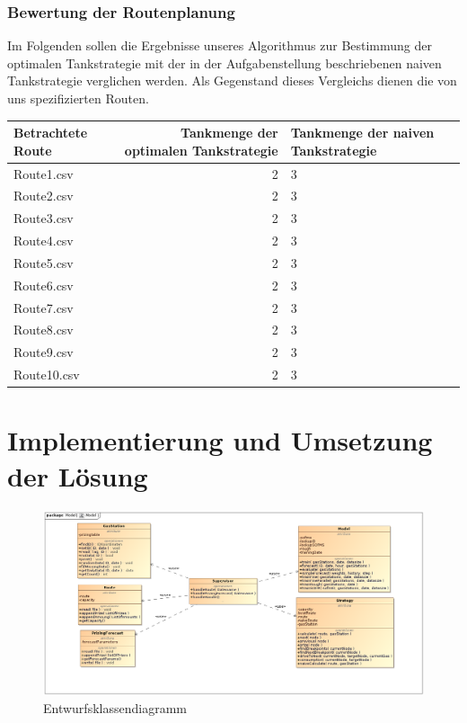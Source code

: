 \documentclass[11pt]{article}
\begin{document}
\subsubsection{Bewertung der Routenplanung}
	Im Folgenden sollen die Ergebnisse unseres Algorithmus zur Bestimmung der optimalen Tankstrategie mit der in der Aufgabenstellung beschriebenen naiven Tankstrategie verglichen werden. Als Gegenstand dieses Vergleichs dienen die von uns spezifizierten Routen.\\
	\begin{tabularx}{\textwidth}{p{}|r|X|r}
		Betrachtete Route & Tankmenge der optimalen Tankstrategie & Tankmenge der naiven Tankstrategie \\
		\hline
		Route1.csv & 2 & 3 \\
		\hline
		Route2.csv & 2 & 3 \\
		\hline
		Route3.csv & 2 & 3 \\
		\hline
		Route4.csv & 2 & 3 \\
		\hline
		Route5.csv & 2 & 3 \\
		\hline
		Route6.csv & 2 & 3 \\
		\hline
		Route7.csv & 2 & 3 \\
		\hline
		Route8.csv & 2 & 3 \\
		\hline
		Route9.csv & 2 & 3 \\
		\hline
		Route10.csv & 2 & 3 \\
	\end{tabularx}
\section{Implementierung und Umsetzung der Lösung}
	
	\begin{figure}[ht]
		\centering
		\includegraphics[width=\textwidth]{Model.png}
		\caption{Entwurfsklassendiagramm}
		\label{design}
	\end{figure}
\end{document}
